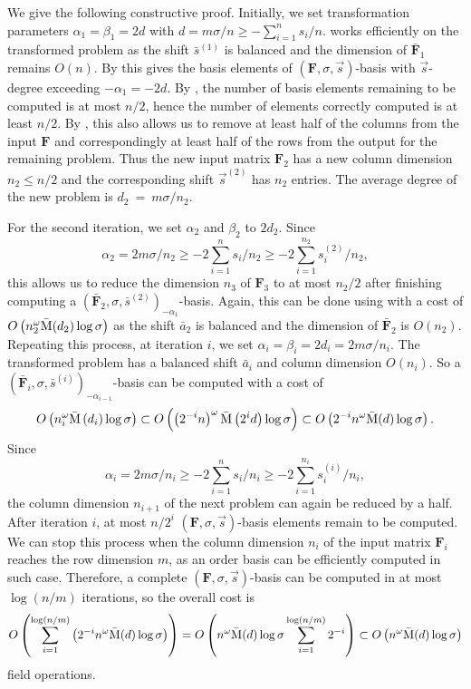 \begin{pf}
We give the following constructive proof. Initially, we set transformation
parameters $\alpha_{1}=\beta_{1}=2d$ with $d=m\sigma/n\ge-\sum_{i=1}^{n}s_{i}/n$.
 works efficiently on the transformed problem
as the shift $\bar{s}^{\left(1\right)}$ is balanced and the dimension
of $\bar{\mathbf{F}}_{1}$ remains $O\left(n\right)$. By 
this gives the basis elements of $\left(\mathbf{F},\sigma,\vec{s}\right)$-basis
with $\vec{s}$-degree exceeding $-\alpha_{1}=-2d$. By ,
the number of basis elements remaining to be computed is at most $n/2$,
hence the number of elements correctly computed is at least $n/2$.
By , this also allows us to remove
at least half of the columns from the input $\mathbf{F}$ and correspondingly
at least half of the rows from the output for the remaining problem.
Thus the new input matrix $\mathbf{F}_{2}$ has a new column dimension
$n_{2}\le n/2$ and the corresponding shift $\vec{s}^{\left(2\right)}$
has $n_{2}$ entries. The average degree of the new problem is $d_{2}~=~m\sigma/n_{2}$.

For the second iteration, we set $\alpha_{2}$ and $\beta_{2}$ to
$2d_{2}$. Since \[
\alpha_{2}=2m\sigma/n_{2}\ge-2\sum_{i=1}^{n}s_{i}/n_{2}\ge-2\sum_{i=1}^{n_{2}}s_{i}^{\left(2\right)}/n_{2},\]
 this allows us to reduce the dimension $n_{3}$ of $\mathbf{F}_{3}$
to at most $n_{2}/2$ after finishing computing a $\left(\bar{\mathbf{F}}_{2},\sigma,\bar{s}^{\left(2\right)}\right)_{-\alpha_{1}}$-basis.
Again, this can be done using  with a cost of
$O\left(n_{2}^{\omega}\bar{\M}(d_{2})\log\sigma\right)$ as the shift
$\bar{a}_{2}$ is balanced and the dimension of $\bar{\mathbf{F}}_{2}$
is $O\left(n_{2}\right)$. Repeating this process, at iteration $i$,
we set $\alpha_{i}=\beta_{i}=2d_{i}=2m\sigma/n_{i}$. The transformed
problem has a balanced shift $\bar{a}_{i}$ and column dimension $O\left(n_{i}\right)$.
So a $\left(\bar{\mathbf{F}}_{i},\sigma,\bar{s}^{\left(i\right)}\right)_{-\alpha_{i-1}}$-basis
can be computed with a cost of \[
O\left(n_{i}^{\omega}\bar{\M}\left(d_{i}\right)\log\sigma\right)\subset O\left(\left(2^{-i}n\right)^{\omega}\bar{\M}\left(2^{i}d\right)\log\sigma\right)\subset O\left(2^{-i}n^{\omega}\bar{\M}(d)\log\sigma\right).\]
 Since \[
\alpha_{i}=2m\sigma/n_{i}\ge-2\sum_{i=1}^{n}s_{i}/n_{i}\ge-2\sum_{i=1}^{n_{i}}s_{i}^{\left(i\right)}/n_{i},\]
 the column dimension $n_{i+1}$ of the next problem can again be
reduced by a half. After iteration $i$, at most $n/2^{i}$ $\left(\mathbf{F},\sigma,\vec{s}\right)$-basis
elements remain to be computed. We can stop this process when the
column dimension $n_{i}$ of the input matrix $\mathbf{F}_{i}$ reaches
the row dimension $m$, as an order basis can be efficiently computed
in such case. Therefore, a complete $\left(\mathbf{F},\sigma,\vec{s}\right)$-basis
can be computed in at most $\log(n/m)$ iterations, so the overall
cost is \[
O\left(\sum_{i=1}^{\log(n/m)}\left(2^{-i}n^{\omega}\bar{\M}(d)\log\sigma\right)\right)=O\left(n^{\omega}\bar{\M}(d)\log\sigma\sum_{i=1}^{\log(n/m)}2^{-i}\right)\subset O\left(n^{\omega}\bar{\M}(d)\log\sigma\right)\]
 field operations. 
\end{pf}
